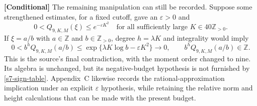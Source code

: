 \noindent\textbf{[Conditional]} The remaining manipulation can still be
recorded.  Suppose some strengthened estimates, for a fixed cutoff,
gave an $\varepsilon>0$ and
\begin{equation}
 0<Q_{9,K,M}(\xi)\leq e^{-\varepsilon K^2}
 \quad\text{for all sufficiently large }K\in40\mathbb Z_{>0}.
 \label{s7-hypothetical-decay}
\end{equation}
If $\xi=a/b$ with $a\in\mathbb Z$ and $b\in\mathbb Z_{>0}$, degree
$h=\lambda K$ and integrality would imply
\[
 0<b^hQ_{9,K,M}(a/b)
 \leq\exp\{\lambda K\log b-\varepsilon K^2\}\longrightarrow0,
 \qquad b^hQ_{9,K,M}(a/b)\in\mathbb Z.
\]
This is the source's final contradiction, with the moment order changed
to nine.  Its algebra is unchanged, but its negative-budget hypothesis
is not furnished by \eqref{s7-sign-table}.  Appendix~C likewise records
the rational-approximation implication under an explicit
$\varepsilon$ hypothesis, while retaining the relative norm and height
calculations that can be made with the present budget.
